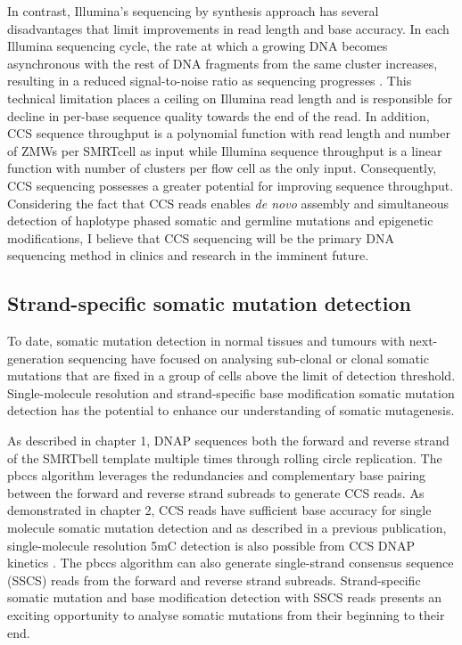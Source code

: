 In contrast, Illumina’s sequencing by synthesis approach has several disadvantages that limit improvements in read length and base accuracy. In each Illumina sequencing cycle, the rate at which a growing DNA becomes asynchronous with the rest of DNA fragments from the same cluster increases, resulting in a reduced signal-to-noise ratio as sequencing progresses \cite{Metzker2005-am}. This technical limitation places a ceiling on Illumina read length and is responsible for decline in per-base sequence quality towards the end of the read. In addition, CCS sequence throughput is a polynomial function with read length and number of ZMWs per SMRTcell as input while Illumina sequence throughput is a linear function with number of clusters per flow cell as the only input. Consequently, CCS sequencing possesses a greater potential for improving sequence throughput. Considering the fact that CCS reads enables \textit{de novo} assembly and simultaneous detection of haplotype phased somatic and germline mutations and epigenetic modifications, I believe that CCS sequencing will be the primary DNA sequencing method in clinics and research in the imminent future. 

\subsection{Strand-specific somatic mutation detection}

To date, somatic mutation detection in normal tissues and tumours with next-generation sequencing have focused on analysing sub-clonal or clonal somatic mutations that are fixed in a group of cells above the limit of detection threshold. Single-molecule resolution and strand-specific base modification somatic mutation detection has the potential to enhance our understanding of somatic mutagenesis.

As described in chapter 1, DNAP sequences both the forward and reverse strand of the SMRTbell template multiple times through rolling circle replication. The pbccs algorithm leverages the redundancies and complementary base pairing between the forward and reverse strand subreads to generate CCS reads. As demonstrated in chapter 2, CCS reads have sufficient base accuracy for single molecule somatic mutation detection and as described in a previous publication, single-molecule resolution 5mC detection is also possible from CCS DNAP kinetics \cite{Vong2019-bi, Tse2021-or}. The pbccs algorithm can also generate single-strand consensus sequence (SSCS) reads from the forward and reverse strand subreads. Strand-specific somatic mutation and base modification detection with SSCS reads presents an exciting opportunity to analyse somatic mutations from their beginning to their end. 

